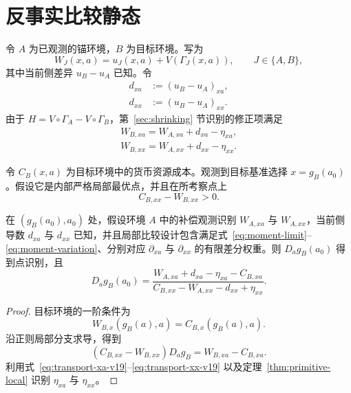 \section{反事实比较静态}
\label{sec:counterfactual}

令 $A$ 为已观测的锚环境，$B$ 为目标环境。写为
\begin{equation}
W_J(x,a)=u_J(x,a)+V(\Gamma_J(x,a)),
\qquad J\in\{A,B\},
\label{eq:WJ-decomp-v19}
\end{equation}
其中当前侧差异 $u_B-u_A$ 已知。令
\begin{align}
d_{xa}&:=(u_B-u_A)_{xa},
\label{eq:d-xa-v19}\\
d_{xx}&:=(u_B-u_A)_{xx}.
\label{eq:d-xx-v19}
\end{align}
由于 $H=V\circ\Gamma_A-V\circ\Gamma_B$，第~\ref{sec:shrinking} 节识别的修正项满足
\begin{align}
\boxed{W_{B,xa}=W_{A,xa}+d_{xa}-\eta_{xa},}
\label{eq:transport-xa-v19}\\
\boxed{W_{B,xx}=W_{A,xx}+d_{xx}-\eta_{xx}.}
\label{eq:transport-xx-v19}
\end{align}

令 $C_B(x,a)$ 为目标环境中的货币资源成本。观测到目标基准选择 $x=g_B(a_0)$。假设它是内部严格局部最优点，并且在所考察点上
\begin{equation}
C_{B,xx}-W_{B,xx}>0.
\label{eq:target-regularity-v19}
\end{equation}

\begin{theorem}[反事实比较静态]
\label{thm:counterfactual-v19}
在 $(g_B(a_0),a_0)$ 处，假设环境 $A$ 中的补偿观测识别 $W_{A,xa}$ 与 $W_{A,xx}$，当前侧导数 $d_{xa}$ 与 $d_{xx}$ 已知，并且局部比较设计包含满足式~\eqref{eq:moment-limit}--\eqref{eq:moment-variation}、分别对应 $\partial_{xa}$ 与 $\partial_{xx}$ 的有限差分权重。则 $D_ag_B(a_0)$ 得到点识别，且
\begin{equation}
\boxed{
D_ag_B(a_0)
=
\frac{
W_{A,xa}+d_{xa}-\eta_{xa}-C_{B,xa}
}{
C_{B,xx}-W_{A,xx}-d_{xx}+\eta_{xx}
}.}
\label{eq:main-response-v19}
\end{equation}
\end{theorem}

\begin{proof}
目标环境的一阶条件为
\[
W_{B,x}(g_B(a),a)=C_{B,x}(g_B(a),a).
\]
沿正则局部分支求导，得到
\[
(C_{B,xx}-W_{B,xx})D_ag_B
=
W_{B,xa}-C_{B,xa}.
\]
利用式~\eqref{eq:transport-xa-v19}--\eqref{eq:transport-xx-v19} 以及定理~\ref{thm:primitive-local} 识别 $\eta_{xa}$ 与 $\eta_{xx}$。
\end{proof}

